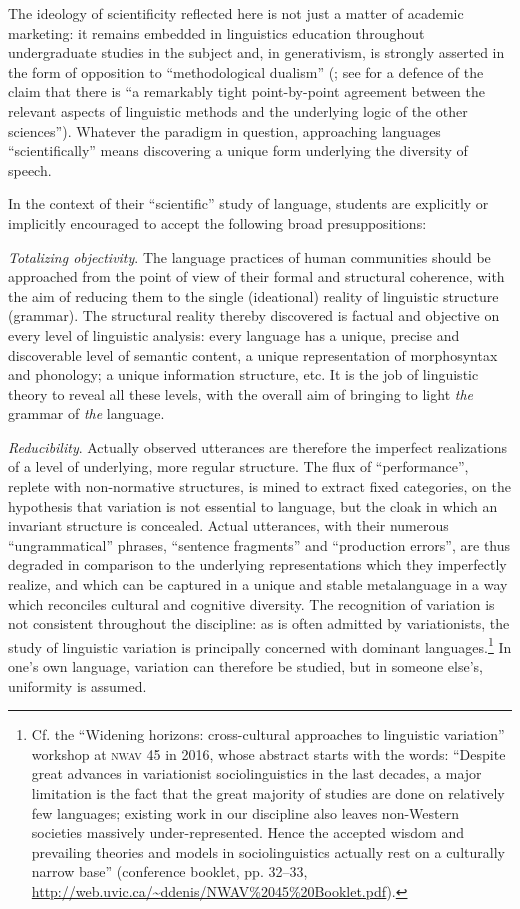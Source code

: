 \documentclass[output=paper]{langscibook}
\begin{document}
\noindent The ideology of scientificity reflected here is not just a matter of academic marketing: it remains embedded in linguistics education throughout undergraduate studies in the subject and, in generativism, is strongly asserted in the form of opposition to ``methodological dualism'' (\citealt{Chomsky1995}; see \citealt[367]{Johnson2007} for a defence of the claim that there is ``a remarkably tight point-by-point agreement between the relevant aspects of linguistic methods and the underlying logic of the other sciences''). Whatever the paradigm in question, approaching languages ``scientifically'' means discovering a unique form underlying the diversity of speech.

In the context of their ``scientific'' study of language, students are explicitly or implicitly encouraged to accept the following broad presuppositions:

\emph{Totalizing objectivity}. The language practices of human communities should be approached from the point of view of their formal and structural coherence, with the aim of reducing them to the single (ideational) reality of linguistic structure (grammar). The structural reality thereby discovered is factual and objective on every level of linguistic analysis: every language has a unique, precise and discoverable level of semantic content, a unique representation of morphosyntax and phonology; a unique information structure, etc. It is the job of linguistic theory to reveal all these levels, with the overall aim of bringing to light \emph{the} grammar of \emph{the} language.

\emph{Reducibility}. Actually observed utterances are therefore the imperfect realizations of a level of underlying, more regular structure. The flux of ``performance'', replete with non-normative structures, is mined to extract fixed categories, on the hypothesis that variation is not essential to language, but the cloak in which an invariant structure is concealed. Actual utterances, with their numerous ``ungrammatical'' phrases, ``sentence fragments'' and ``production errors'', are thus degraded in comparison to the underlying representations which they imperfectly realize, and which can be captured in a unique and stable metalanguage in a way which reconciles cultural and cognitive diversity. The recognition of variation is not consistent throughout the discipline: as is often admitted by variationists, the study of linguistic variation is principally concerned with dominant languages.\footnote{Cf. the ``Widening horizons: cross-cultural approaches to linguistic variation'' workshop at \textsc{nwav} 45 in 2016, whose abstract starts with the words: ``Despite great advances in variationist sociolinguistics in the last decades, a major limitation is the fact that the great majority of studies are done on relatively few languages; existing work in our discipline also leaves non-Western societies massively under-represented. Hence the accepted wisdom and prevailing theories and models in sociolinguistics actually rest on a culturally narrow base'' (conference booklet, pp. 32--33, \url{http://web.uvic.ca/~ddenis/NWAV\%2045\%20Booklet.pdf}).} In one's own language, variation can therefore be studied, but in someone else's, uniformity is assumed.
\end{document}
